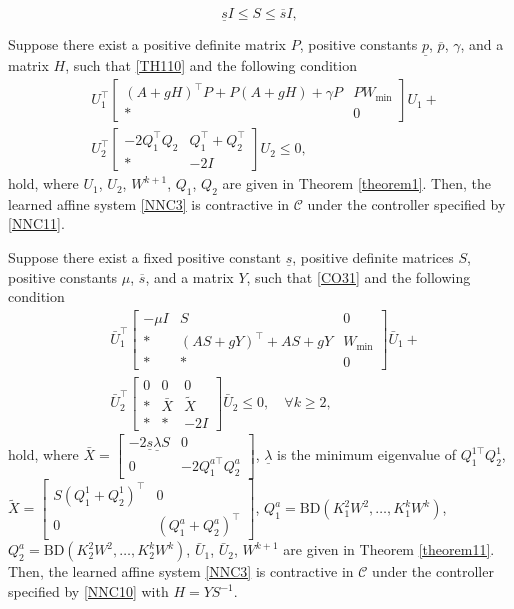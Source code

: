 \documentclass[10pt,a4paper]{amsart}
\newcommand{\bbm}[1]{\left[\begin{matrix} #1 \end{matrix}\right]}
\begin{document}
\begin{equation}\label{CO31}
 \underline{s}I\leq S\leq \overline{s}I, 
\end{equation}

\begin{theorem}\label{theorem2}
Suppose there exist a positive definite matrix $P$, positive constants $\underline{p}$, $\overline{p}$, $\gamma$, and a matrix $H$, such that \eqref{TH110} and the following condition 
\begin{equation}\label{TH22}
\begin{aligned}
&U_1^\top
\begin{bmatrix}
     (A+gH)^\top P+P(A+gH)+\gamma P &PW_{\min}\\
   \ast & 0
\end{bmatrix}U_1+\\&U_2^\top\begin{bmatrix}
 -2Q_1^\top Q_2&Q_1^\top+Q_2^\top
 \\
\ast&-2I
\end{bmatrix}U_2\leq 0,
\end{aligned}
\end{equation}
hold, where $U_1$, $U_2$, $W^{k+1}$, $Q_1$, $Q_2$ are given in Theorem \ref{theorem1}. Then, the learned affine system \eqref{NNC3} is contractive in $\mathcal{C}$ under the controller specified by \eqref{NNC11}.
\end{theorem}

\begin{theorem}\label{theorem3}
Suppose there exist a fixed positive constant $\underline{s}$, positive definite matrices $S$, positive constants $\mu$,  $\overline{s}$, and a matrix $Y$, such that \eqref{CO31} and the following condition
\begin{equation}\label{TH32}
\begin{aligned}
&\bar{U}_1^\top
\bbm{
-\mu I & S & 0 \\
\ast &  (AS+gY)^\top + AS + gY & W_{\min} \\
\ast & \ast & 0
}
\bar{U}_1 + \\
&\bar{U}_2^\top
\bbm{
0 & 0 & 0 \\
\ast & \bar{X} &\tilde{X} \\
\ast & \ast & -2I
}
\bar{U}_2 \leq 0, \quad \forall k \geq 2, 
\end{aligned}
\end{equation}
hold, where $\bar{X}=\bbm{-2\underline{s} \underline{\lambda}S&0\\0&-2Q^{a\top}_1 Q^a_2}$, $\underline{\lambda}$ is the minimum eigenvalue of $Q^{1\top}_1 Q^1_2$,  $\tilde{X}=\bbm{S(Q^1_1+Q^1_2)^\top&0\\0&(Q^a_1+Q^a_2)^\top}$, $Q^a_1=\mathrm{BD}(K_1^2W^2, \dots, K_1^{k}W^{k})$, $Q^a_2=\mathrm{BD}(K_2^2W^2, \dots, K_2^{k}W^{k})$, $\bar{U}_1$, $\bar{U}_2$, $W^{k+1}$ are given in Theorem \ref{theorem11}. Then, the learned affine system \eqref{NNC3} is contractive in $\mathcal{C}$ under the controller specified by \eqref{NNC10} with $H=YS^{-1}$.
\end{theorem}
\end{document}
